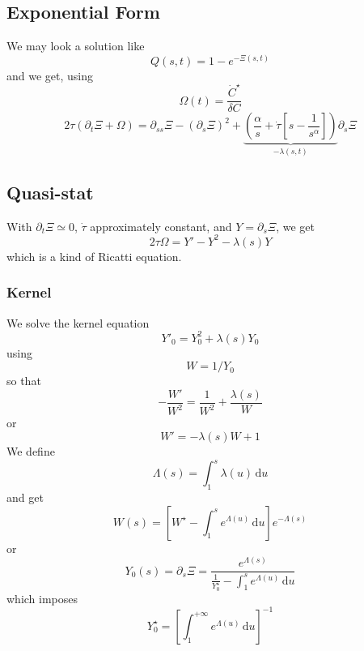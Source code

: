 \documentclass[11pt]{revtex4}
\begin{document}
\subsection{Exponential Form}
We may look a solution like
\begin{equation}
	Q(s,t) = 1 - e^{-\Xi(s,t)}
\end{equation}
and we get, using
$$
	\Omega(t) = \dfrac{\dot{C}^\star}{\delta C}
$$
\begin{equation}
	2\tau \left( \partial_t \Xi + \Omega \right) = \partial_{ss} \Xi - \left(\partial_s \Xi\right)^2 + \underbrace{\left( \dfrac{\alpha}{s} + \dot{\tau} \left[s - \dfrac{1}{s^\alpha} \right] \right)}_{-\lambda(s,t)} \partial_s \Xi 
\end{equation}

\subsection{Quasi-stat}
With $ \partial_t \Xi \simeq 0$, $\dot{\tau}$ approximately constant, and $Y=\partial_s \Xi$, we get
\begin{equation}
	2\tau\Omega = Y' - Y^2 - \lambda(s) Y 
\end{equation} 
which is a kind of Ricatti equation.

\subsubsection{Kernel}
We solve the kernel equation
\begin{equation}
	Y'_0 = Y^2_0 + \lambda(s)Y_0
\end{equation}
using 
$$
	W = 1/Y_0
$$
so that
\begin{equation}
	-\dfrac{W'}{W^2} = \dfrac{1}{W^2} + \dfrac{\lambda(s)}{W}
\end{equation}
or
\begin{equation}
	W' = -\lambda(s) W + 1
\end{equation}
We define
\begin{equation}
	\Lambda(s) = \int_{1}^s \lambda(u) \, \mathrm{d}u
\end{equation}
and get
\begin{equation}
	W(s) = \left\lbrack W^\star - \int_1^s e^{\Lambda(u)} \, \mathrm{d} u \right\rbrack e^{-\Lambda(s)}
\end{equation}
or
\begin{equation}
	Y_0(s) = \partial_s \Xi = \dfrac{e^{\Lambda(s)}}{ \frac{1}{Y_0^\star} - \int_1^s e^{\Lambda(u)} \, \mathrm{d} u }
\end{equation}
which imposes
\begin{equation}
	Y_0^\star = \left[ 
	\int_1^{+\infty} e^{\Lambda(u)} \, \mathrm{d} u 
	\right]^{-1}
\end{equation}
\end{document}
